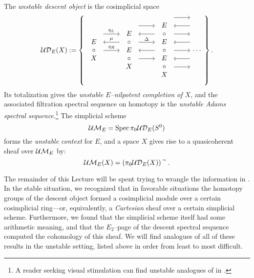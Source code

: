 \begin{definition}\label{UASSDefinition}
The \textit{unstable descent object} is the cosimplicial space
\[\sheaf{UD}_E(X) := \left\{
\begin{tikzcd}
\begin{array}{c} E \\ \circ \\ X \end{array} \arrow[leftarrow, shift left=\baselineskip]{r}{\mu} \arrow[shift left=(2*\baselineskip)]{r}{\eta_L} \arrow{r}{\eta_R} &
\begin{array}{c} E \\ \circ \\ E \\ \circ \\ X \end{array} \arrow[shift left=(3*\baselineskip)]{r} \arrow[leftarrow, shift left=(2*\baselineskip)]{r} \arrow[shift left=\baselineskip]{r}{\Delta} \arrow[leftarrow]{r} \arrow[shift right=\baselineskip]{r} &
\begin{array}{c} E \\ \circ \\ E \\ \circ \\ E \\ \circ \\ X \end{array} \arrow[shift left=(4*\baselineskip)]{r} \arrow[leftarrow, shift left=(3*\baselineskip)]{r} \arrow[shift left=(2*\baselineskip)]{r} \arrow[leftarrow, shift left=\baselineskip]{r} \arrow{r} \arrow[leftarrow, shift right=\baselineskip]{r} \arrow[shift right=(2*\baselineskip)]{r} &
\cdots
\end{tikzcd}
\right\}.\]
Its totalization gives the \textit{unstable \(E\)--nilpotent completion of \(X\)}, and the associated filtration spectral sequence on homotopy is the \textit{unstable Adams spectral sequence}.\footnote{A reader seeking visual stimulation can find unstable analogues of  in \cite{BPS}.}  The simplicial scheme \[\mathcal{UM}_{E} = \operatorname{Spec} \pi_0 \mathcal{UD}_E(S^0)\] forms the \textit{unstable context} for \(E\), and a space \(X\) gives rise to a quasicoherent sheaf over \(\mathcal{UM}_{E}\) by: \[\mathcal{UM}_{E}(X) = (\pi_0 \mathcal{UD}_E(X))\widetilde{\quad}.\]
\end{definition}

The remainder of this Lecture will be spent trying to wrangle the information in .  In the stable situation, we recognized that in favorable situations the homotopy groups of the descent object formed a cosimplicial module over a certain cosimplicial ring---or, equivalently, a \emph{Cartesian} sheaf over a certain simplicial scheme.  Furthermore, we found that the simplicial scheme itself had some arithmetic meaning, and that the \(E_2\)--page of the descent spectral sequence computed the cohomology of this sheaf.  We will find analogues of all of these results in the unstable setting, listed above in order from least to most difficult.

